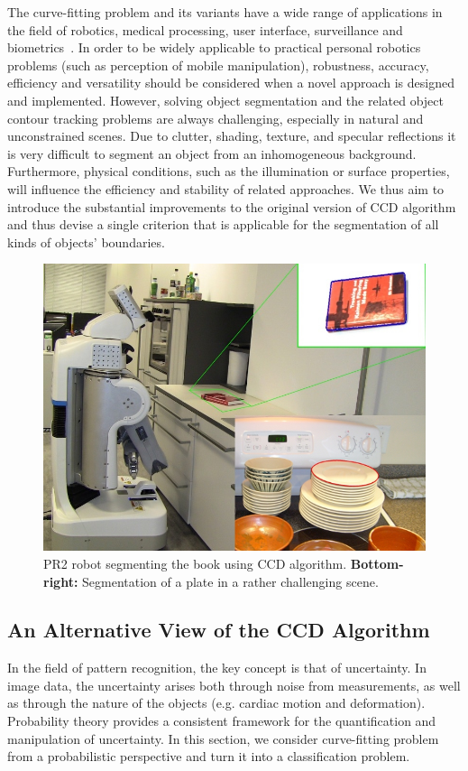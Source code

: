 \documentclass[conference]{IEEEtran}
\begin{document}
The curve-fitting problem and its variants have a wide range of
applications in the field of robotics, medical processing, user
interface, surveillance and biometrics~\cite{hanek2004fitting}. In order to be
widely applicable to practical personal robotics problems (such as
perception of mobile manipulation), robustness,
accuracy, efficiency and versatility should be
considered when a novel approach is designed and implemented.
However, solving object segmentation and the
related object contour tracking problems are always challenging,
especially in natural and unconstrained scenes. Due to clutter,
shading, texture, and specular reflections it is very difficult to segment
an object from an inhomogeneous background. Furthermore, physical
conditions, such as the illumination or surface properties, will
influence the efficiency and stability of related approaches. 
We thus aim to introduce the substantial improvements to the original
version of CCD algorithm and thus devise a single criterion that is 
applicable for the segmentation of all kinds of objects' boundaries.

\begin{figure}[htbp]
  \centering
  \includegraphics[width=\columnwidth]{experiments/teaser.jpg}
  \caption{PR2 robot segmenting the book using CCD algorithm. 
    \textbf{Bottom-right:} Segmentation of a plate in a rather
  challenging scene.}
  \label{fig:divide}
\end{figure}

\subsection{An Alternative View of the CCD Algorithm}
\label{sec:overview}
In the field of pattern recognition, the key concept is that of
uncertainty. In image data, the uncertainty arises both
through noise from measurements, as well as through the nature of
the objects (e.g. cardiac motion and deformation). Probability theory
provides a consistent framework for the quantification and
manipulation of uncertainty.  In this section, we consider curve-fitting
problem from a probabilistic perspective and turn it into
a classification problem.
\end{document}
